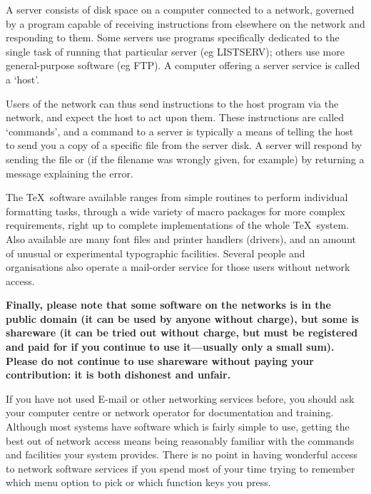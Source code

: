      A server consists of disk space on a computer connected to a
     network, governed by a program capable of receiving instructions
     from elsewhere on the network and responding to them. Some servers
     use programs specifically dedicated to the single task of running
     that particular server (eg LISTSERV); others use more
     general-purpose software (eg FTP). A computer offering a server
     service is called a `host'.

     Users of the network can thus send instructions to the host program
     via the network, and expect the host to act upon them. These
     instructions are called `commands', and a command to a server is
     typically a means of telling the host to send you a copy of a
     specific file from the server disk. A server will respond by
     sending the file or (if the filename was wrongly given, for
     example) by returning a message explaining the error.

     The \TeX\ software available ranges from simple routines to perform
     individual formatting tasks, through a wide variety of macro
     packages for more complex requirements, right up to complete
     implementations of the whole \TeX\ system. Also available are many
     font files and printer handlers (drivers), and an amount of unusual
     or experimental typographic facilities. Several people and
     organisations also operate a mail-order service for those users
     without network access.

{\bf Finally, please note that some software on the networks is in the
     public domain (it can be used by anyone without charge), but some
     is shareware (it can be tried out without charge, but must be
     registered and paid for if you continue to use it---usually only a
     small sum). Please do not continue to use shareware without paying
     your contribution: it is both dishonest and unfair.}


     If you have not used E-mail or other networking services before,
     you should ask your computer centre or network operator for
     documentation and training. Although most systems have software
     which is fairly simple to use, getting the best out of network
     access means being reasonably familiar with the commands and
     facilities your system provides. There is no point in having
     wonderful access to network software services if you spend most of
     your time trying to remember which menu option to pick or which
     function keys you press.

